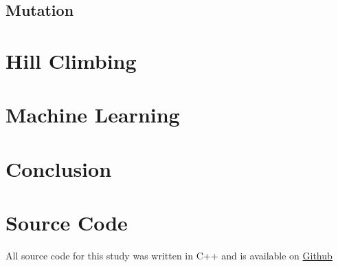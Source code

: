 \documentclass[12pt]{article}
\begin{document}
\subsection{Mutation}



\pagebreak

\section{Hill Climbing}

\pagebreak

\section{Machine Learning}

\pagebreak

\section{Conclusion}

\pagebreak

\section{Source Code}
All source code for this study was written in C++ and is
available on
\href{https://github.com/Quinny/IteratedPrisoners}{Github}
\end{document}
